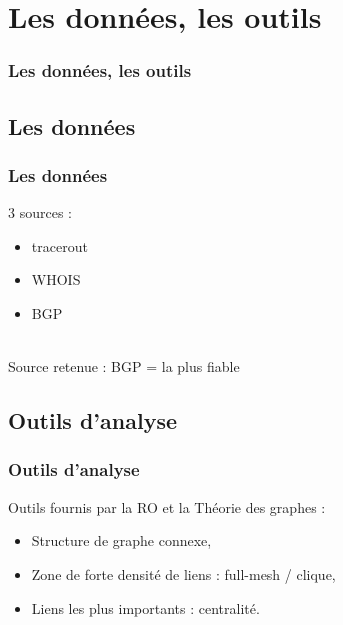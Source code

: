 \section{Les donn\'ees, les outils}

\begin{frame}
 	\frametitle{Les donn\'ees, les outils}
\end{frame}

\subsection{Les donn\'ees}
\frame
{
\frametitle{Les donn\'ees}
3 sources : \\
\begin{itemize}
 \item tracerout
 \item WHOIS
 \item BGP
\end{itemize}
~\\
Source retenue : BGP = la plus fiable
}

\subsection{Outils d'analyse}
\frame
{
\frametitle{Outils d'analyse}
Outils fournis par la RO et la Th\'eorie des graphes : \\
\begin{itemize}
 \item Structure de graphe connexe,
 \item Zone de forte densit\'e de liens : full-mesh / clique,
 \item Liens les plus importants : centralit\'e.
\end{itemize}
}

